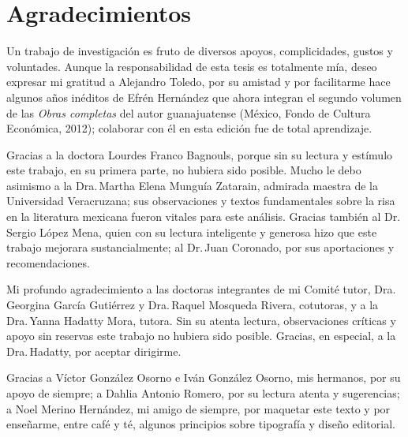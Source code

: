 \documentclass[14pt,twoside,final]{extbook} %
\begin{document}
\chapter*{Agradecimientos}\label{ch:agradecimientos}
\thispagestyle{empty}
\pagestyle{fancy}
\fancyhf{} %
\fancyhead[LE,RO]{\textlf{\thepage}}
\renewcommand{\headrulewidth}{0pt}
\setcounter{page}{5}
Un trabajo de investigación es fruto de diversos apoyos, complicidades, gustos y voluntades. Aunque la responsabilidad de esta tesis es totalmente mía, deseo expresar mi gratitud a Alejandro Toledo, por su amistad y por facilitarme hace algunos años inéditos de Efrén Hernández que ahora integran el segundo volumen de las \emph{Obras completas} del autor guanajuatense (México, Fondo de Cultura Económica, 2012); colaborar con él en esta edición fue de total aprendizaje.

Gracias a la doctora Lourdes Franco Bagnouls, porque sin su lectura y estímulo este trabajo, en su primera parte, no hubiera sido posible. Mucho le debo asimismo a la Dra.\,Martha Elena Munguía Zatarain, admirada maestra de la Universidad Veracruzana; sus observaciones y textos fundamentales sobre la risa en la literatura mexicana fueron vitales para este análisis. Gracias también al Dr.\,Sergio López Mena, quien con su lectura inteligente y generosa hizo que este trabajo mejorara sustancialmente; al Dr.\,Juan Coronado, por sus aportaciones y recomendaciones.

Mi profundo agradecimiento a las doctoras integrantes de mi Comité tutor, Dra.\,Georgina García Gutiérrez y Dra.\,Raquel Mosqueda Rivera, cotutoras, y a la Dra.\,Yanna Hadatty Mora, tutora. Sin su atenta lectura, observaciones críticas y apoyo sin reservas este trabajo no hubiera sido posible. Gracias, en especial, a la Dra.\,Hadatty, por aceptar dirigirme.

Gracias a Víctor González Osorno e Iván González Osorno, mis hermanos, por su apoyo de siempre; a Dahlia Antonio Romero, por su lectura atenta y sugerencias; a Noel Merino Hernández, mi amigo de siempre, por maquetar este texto y por enseñarme, entre café y té, algunos principios sobre tipografía y diseño editorial.
\end{document}
